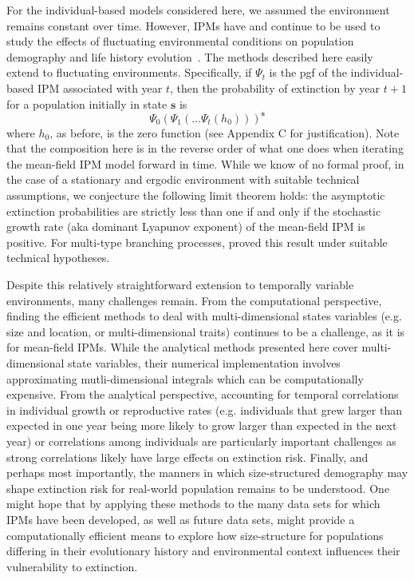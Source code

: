 \documentclass[12pt]{amsart}\usepackage[]{graphicx}\usepackage[]{color}
\def\s{\mathbf s}
\begin{document}
For the individual-based models considered here, we assumed the environment remains constant over time. However, IPMs have and continue to be used to study the effects of fluctuating environmental conditions on population demography and life history evolution~\citep{childs-etal-04, dahlgren-ehrlen-11, rees-ellner-09}. The methods described here easily extend to fluctuating environments. Specifically, if $\Psi_t$ is the pgf of the individual-based IPM associated with year $t$, then the probability of extinction by year $t+1$ for a population initially in state $\s$ is
\[
\Psi_0(\Psi_1(\dots \Psi_t(h_0)))^\s
\]
where $h_0$, as before, is the zero function (see Appendix C for justification). Note that the composition here is in the reverse order of what one does when iterating the mean-field IPM model forward in time. While we know of no formal proof, in the case of a stationary and ergodic environment with suitable technical assumptions, we conjecture the following limit theorem holds: the asymptotic extinction probabilities are strictly less than one if and only if the stochastic growth rate (aka dominant Lyapunov exponent) of the mean-field IPM is positive. For multi-type branching processes, \citet[Theorem 12]{athreya-karlin-71} proved this result under suitable technical hypotheses.

Despite this relatively straightforward extension to temporally variable environments, many challenges remain. From the computational perspective, finding the efficient methods to deal with multi-dimensional states variables (e.g. size and location, or multi-dimensional traits) continues to be a challenge, as it is for mean-field IPMs. While the analytical methods presented here cover multi-dimensional state variables, their numerical implementation involves approximating mutli-dimensional integrals which can be computationally expensive. From the analytical perspective, accounting for temporal correlations in individual growth or reproductive rates (e.g. individuals that grew larger than expected in one year being more likely to grow larger than expected in the next year) or correlations among individuals are particularly important challenges as strong correlations likely have large effects on extinction risk.
Finally, and perhaps most importantly, the  manners in which size-structured demography may shape extinction risk for real-world population remains to be understood. One might hope that by applying these methods to the many data sets for which IPMs have been developed, as well as future data sets, might provide a computationally efficient means to explore how size-structure for populations differing in their evolutionary history and environmental context influences their vulnerability to extinction.
\end{document}
